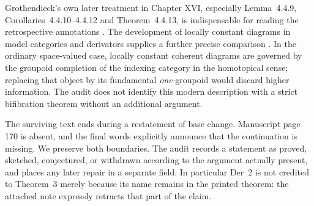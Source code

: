 Grothendieck's own later treatment in Chapter XVI, especially Lemma~4.4.9, Corollaries~4.4.10--4.4.12 and Theorem~4.4.13, is indispensable for reading the retrospective annotations \citep{GrothendieckDerivateursXVI}. The development of locally constant diagrams in model categories and derivators supplies a further precise comparison \citep[Theorem~1.3; \S\S2--3]{Cisinski2009LocallyConstant}. In the ordinary space-valued case, locally constant coherent diagrams are governed by the groupoid completion of the indexing category in the homotopical sense; replacing that object by its fundamental \emph{one}-groupoid would discard higher information. The audit does not identify this modern description with a strict bifibration theorem without an additional argument.

The surviving text ends during a restatement of base change. Manuscript page 170 is absent, and the final words explicitly announce that the continuation is missing. We preserve both boundaries. The audit records a statement as proved, sketched, conjectured, or withdrawn according to the argument actually present, and places any later repair in a separate field. In particular Der~2 is not credited to Theorem~3 merely because its name remains in the printed theorem: the attached note expressly retracts that part of the claim.
